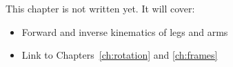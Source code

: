 \label{ch:k12}
\begin{keyidea}
This chapter is not written yet. It will cover:
\begin{itemize}[nosep]
  \item Forward and inverse kinematics of legs and arms
  \item Link to Chapters~\ref{ch:rotation} and \ref{ch:frames}
\end{itemize}
\end{keyidea}
